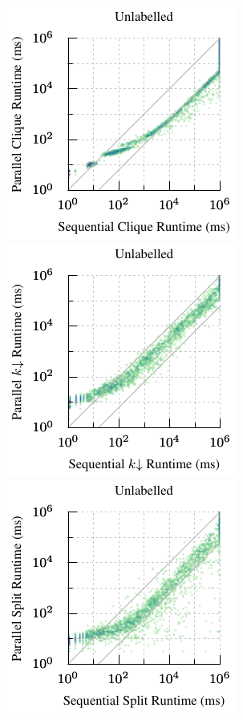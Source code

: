 \documentclass{llncs}
\begin{document}
\begin{figure}[p]
    \centering
    \hspace*{0.5em}\includegraphics*[scale=0.7]{plots/plain-par-heatmap-clique.pdf}\hfill
    \includegraphics*[scale=0.7]{plots/plain-par-heatmap-kdown.pdf}\hfill
    \includegraphics*[scale=0.7]{plots/plain-par-heatmap-james.pdf}\hspace*{0.5em}


\end{figure}
\end{document}
